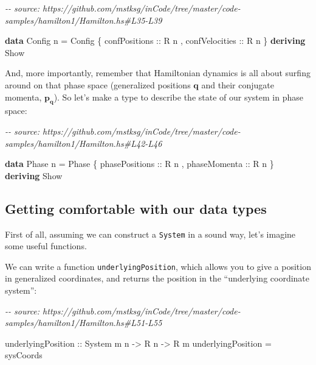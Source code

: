 \documentclass[]{article}
\newenvironment{Shaded}{}{}
\newcommand{\CommentTok}[1]{\textcolor[rgb]{0.38,0.63,0.69}{\textit{#1}}}
\newcommand{\DataTypeTok}[1]{\textcolor[rgb]{0.56,0.13,0.00}{#1}}
\newcommand{\KeywordTok}[1]{\textcolor[rgb]{0.00,0.44,0.13}{\textbf{#1}}}
\newcommand{\NormalTok}[1]{#1}
\newcommand{\OtherTok}[1]{\textcolor[rgb]{0.00,0.44,0.13}{#1}}
\begin{document}
\begin{Shaded}
\begin{Highlighting}[]
\CommentTok{{-}{-} source: https://github.com/mstksg/inCode/tree/master/code{-}samples/hamilton1/Hamilton.hs\#L35{-}L39}

\KeywordTok{data} \DataTypeTok{Config}\NormalTok{ n }\OtherTok{=} \DataTypeTok{Config}
\NormalTok{    \{}\OtherTok{ confPositions  ::} \DataTypeTok{R}\NormalTok{ n}
\NormalTok{    ,}\OtherTok{ confVelocities ::} \DataTypeTok{R}\NormalTok{ n}
\NormalTok{    \}}
  \KeywordTok{deriving} \DataTypeTok{Show}
\end{Highlighting}
\end{Shaded}

And, more importantly, remember that Hamiltonian dynamics is all about surfing
around on that phase space (generalized positions \(\mathbf{q}\) and their
conjugate momenta, \(\mathbf{p_q}\)). So let's make a type to describe the state
of our system in phase space:

\begin{Shaded}
\begin{Highlighting}[]
\CommentTok{{-}{-} source: https://github.com/mstksg/inCode/tree/master/code{-}samples/hamilton1/Hamilton.hs\#L42{-}L46}

\KeywordTok{data} \DataTypeTok{Phase}\NormalTok{ n }\OtherTok{=} \DataTypeTok{Phase}
\NormalTok{    \{}\OtherTok{ phasePositions ::} \DataTypeTok{R}\NormalTok{ n}
\NormalTok{    ,}\OtherTok{ phaseMomenta   ::} \DataTypeTok{R}\NormalTok{ n}
\NormalTok{    \}}
  \KeywordTok{deriving} \DataTypeTok{Show}
\end{Highlighting}
\end{Shaded}

\hypertarget{getting-comfortable-with-our-data-types}{%
\subsection{Getting comfortable with our data
types}\label{getting-comfortable-with-our-data-types}}

First of all, assuming we can construct a \texttt{System} in a sound way, let's
imagine some useful functions.

We can write a function \texttt{underlyingPosition}, which allows you to give a
position in generalized coordinates, and returns the position in the
``underlying coordinate system'':

\begin{Shaded}
\begin{Highlighting}[]
\CommentTok{{-}{-} source: https://github.com/mstksg/inCode/tree/master/code{-}samples/hamilton1/Hamilton.hs\#L51{-}L55}

\NormalTok{underlyingPosition}
\OtherTok{    ::} \DataTypeTok{System}\NormalTok{ m n}
    \OtherTok{{-}>} \DataTypeTok{R}\NormalTok{ n}
    \OtherTok{{-}>} \DataTypeTok{R}\NormalTok{ m}
\NormalTok{underlyingPosition }\OtherTok{=}\NormalTok{ sysCoords}
\end{Highlighting}
\end{Shaded}
\end{document}
